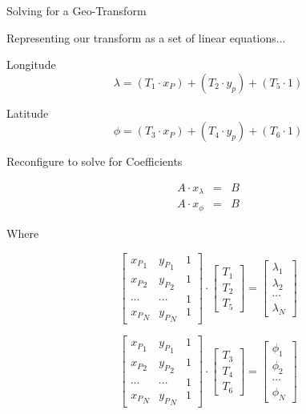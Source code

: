 \documentclass[10pt]{report}
\begin{document}
Solving for a Geo-Transform

Representing our transform as a set of linear equations...

Longitude
\begin{equation}
\lambda = \left( T_1 \cdot x_P \right) + \left( T_2 \cdot y_p \right) + \left( T_5 \cdot 1 \right) 
\end{equation}

Latitude
\begin{equation}
\phi = \left( T_3 \cdot x_P \right) + \left( T_4 \cdot y_p \right) + \left( T_6 \cdot 1 \right) 
\end{equation}

Reconfigure to solve for Coefficients

\begin{equation}
\begin{matrix}
A \cdot x_{\lambda} & = & B\\
A \cdot x_{\phi}    & = & B
\end{matrix}
\end{equation}

Where

\begin{equation}
\begin{bmatrix}
{x_P}_1 & {y_P}_1 & 1 \\
{x_P}_2 & {y_P}_2 & 1 \\
\cdots  & \cdots  & 1 \\
{x_P}_N & {y_P}_N & 1
\end{bmatrix}
\cdot 
\begin{bmatrix}
T_1\\T_2\\T_5
\end{bmatrix} = 
\begin{bmatrix}
\lambda_1\\
\lambda_2\\
\cdots\\
\lambda_N
\end{bmatrix}
\end{equation}

\begin{equation}
    \begin{bmatrix}
    {x_P}_1 & {y_P}_1 & 1 \\
    {x_P}_2 & {y_P}_2 & 1 \\
    \cdots  & \cdots  & 1 \\
    {x_P}_N & {y_P}_N & 1
    \end{bmatrix}
    \cdot 
    \begin{bmatrix}
    T_3\\T_4\\T_6
    \end{bmatrix} = 
    \begin{bmatrix}
    \phi_1\\
    \phi_2\\
    \cdots\\
    \phi_N
    \end{bmatrix}
    \end{equation}
\end{document}
